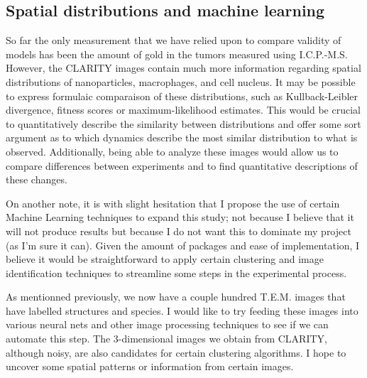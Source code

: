 \subsection{Spatial distributions and machine learning}

So far the only measurement that we have relied upon to compare validity of models has been the amount of gold in the tumors measured using I.C.P.-M.S. 
However, the CLARITY images contain much more information regarding spatial distributions of nanoparticles, macrophages, and cell nucleus. 
It may be possible to express formulaic comparaison of these distributions, such as Kullback-Leibler divergence, fitness scores or maximum-likelihood estimates.
This would be crucial to quantitatively describe the similarity between distributions and offer some sort argument as to which dynamics describe the most similar distribution to what is observed.
Additionally, being able to analyze these images would allow us to compare differences between experiments and to find  quantitative descriptions of these changes.


On another note, it is with slight hesitation that I propose the use of certain Machine Learning techniques to expand this study; not because I believe that it will not produce results but because I do not want this to dominate my project (as I'm sure it can). 
Given the amount of packages and ease of implementation, I believe it would be straightforward to apply certain clustering and image identification techniques to streamline some steps in the experimental process.

As mentionned previously, we now have a couple hundred T.E.M. images that have labelled structures and species. 
I would like to try feeding these images into various neural nets and other image processing techniques to see if we can automate this step.
The 3-dimensional images we obtain from CLARITY, although noisy, are also candidates for certain clustering algorithms.
I hope to uncover some spatial patterns or information from certain images.

